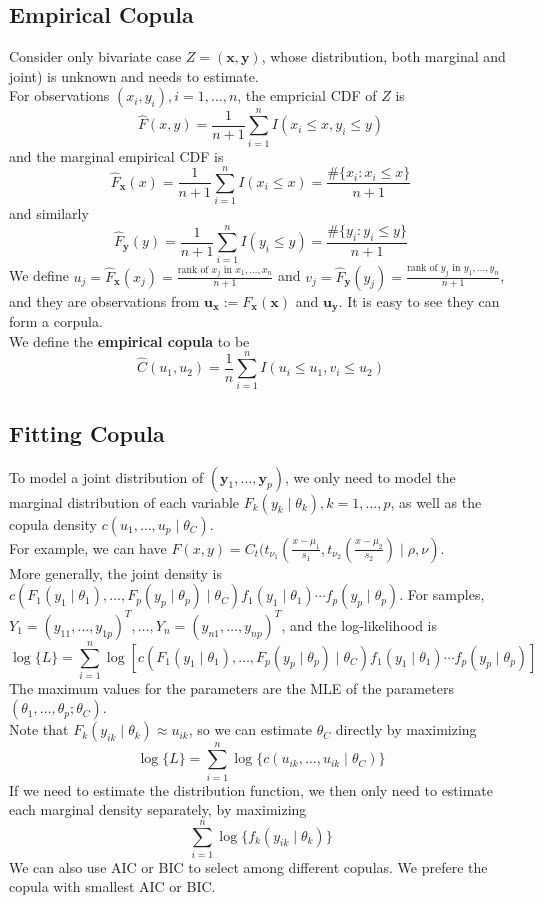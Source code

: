 \documentclass[12pt]{article}
\theoremstyle{definition}
\begin{document}
\subsection{Empirical Copula}
Consider only bivariate case $Z=(\mathbf{x}, \mathbf{y})$, whose distribution, both marginal and joint) is unknown and needs to estimate.\\
For observations $(x_i, y_i), i = 1,\ldots, n$, the empricial CDF of $Z$ is 
\[
\hat{F}(x,y)=\frac{1}{n+1}\sum_{i=1}^n I(x_i\leq x, y_i\leq y)
\]
and the marginal empirical CDF is
\[
\hat{F}_\mathbf{x}(x)=\frac{1}{n+1}\sum_{i=1}^n I(x_i\leq x) = \frac{\#\{x_i: x_i\leq x\}}{n+1}
\]
and similarly
\[
\hat{F}_\mathbf{y}(y)=\frac{1}{n+1}\sum_{i=1}^n I(y_i\leq y) = \frac{\#\{y_i: y_i\leq y\}}{n+1}
\]
We define $u_j=\hat{F}_\mathbf{x}(x_j) = \frac{\text{rank of }x_j\text{ in }x_1,\ldots, x_n}{n+1}$ and
$v_j=\hat{F}_\mathbf{y}(y_j) = \frac{\text{rank of }y_j\text{ in }y_1,\ldots, y_n}{n+1}$, and they are observations from $\mathbf{u}_\mathbf{x}:=F_\mathbf{x}(\mathbf{x})$ and $\mathbf{u}_\mathbf{y}$. It is easy to see they can form a corpula.\\
We define the \textbf{empirical copula} to be
\[
\hat{C}(u_1,u_2)=\frac{1}{n}\sum_{i=1}^n I(u_i\leq u_1, v_i\leq u_2)
\]
\subsection{Fitting Copula}
To model a joint distribution of $(\mathbf{y}_1, \ldots, \mathbf{y}_p)$, we only need to model the marginal distribution of each variable $F_k(y_k\mid \theta_k), k = 1,\ldots, p$, as well as the copula density $c(u_1,\ldots, u_p\mid \theta_C)$.\\
For example, we can have $F(x,y) = C_t(t_{\nu_1}(\frac{x-\mu_1}{s_1}, t_{\nu_2}(\frac{x-\mu_2}{s_2})\mid \rho, \nu)$.\\
More generally, the joint density is $c(F_1(y_1\mid \theta_1), \ldots, F_p(y_p\mid \theta_p)\mid \theta_C)f_1(y_1\mid \theta_1)\cdots f_p(y_p\mid \theta_p)$. For samples, $Y_1 = (y_{11}, \ldots, y_{1p})^T, \ldots, Y_n=(y_{n1},\ldots, y_{np})^T$, and the log-likelihood is
\[
\log\{L\}=\sum_{i=1}^n \log[c(F_1(y_1\mid \theta_1), \ldots, F_p(y_p\mid \theta_p)\mid \theta_C)f_1(y_1\mid \theta_1)\cdots f_p(y_p\mid \theta_p)]
\]
The maximum values for the parameters are the MLE of the parameters $(\theta_1, \ldots, \theta_p; \theta_C)$.\\
Note that $F_k(y_{ik}\mid \theta_k)\approx u_{ik}$, so we can estimate $\theta_C$ directly by maximizing 
\[
\log\{L\}=\sum_{i=1}^n \log\{c(u_{ik}, \ldots, u_{ik}\mid \theta_C)\}
\]
If we need to estimate the distribution function, we then only need to estimate each marginal density separately, by maximizing 
\[
\sum_{i=1}^n \log\{f_k(y_{ik}\mid \theta_k)\}
\]
We can also use AIC or BIC to select among different copulas. We prefere the copula with smallest AIC or BIC.
\end{document}
